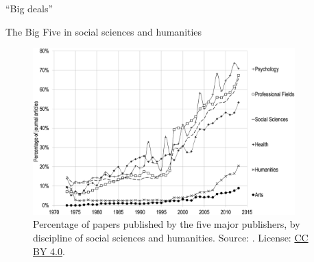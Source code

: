 \documentclass{beamer}
\begin{document}

\begin{frame}{``Big deals''}
	\begin{itemize}
	\end{itemize}
\end{frame}


\begin{frame}{The Big Five in social sciences and humanities}
	\begin{figure}
		\includegraphics[width=0.9\textwidth]{lhm_1.png}
		\caption{Percentage of papers published by the five major publishers, by discipline of social sciences and humanities. Source: \citet{lariviere_oligopoly_2015}. License: \href{https://creativecommons.org/licenses/by/4.0/}{CC BY 4.0}.}
	\end{figure}
\end{frame}

\end{document}
